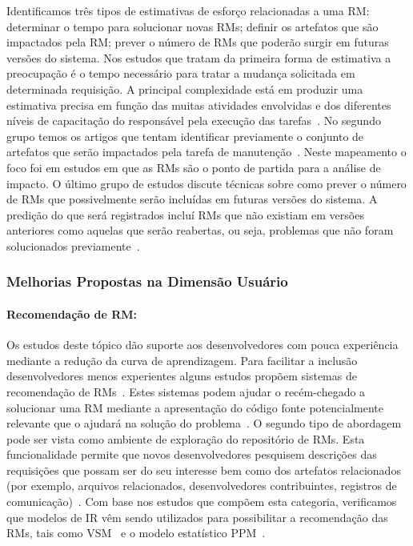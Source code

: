 Identificamos três tipos de estimativas de esforço relacionadas a uma RM\@:
determinar o tempo para solucionar novas RMs; definir os artefatos que são
impactados pela RM\@; prever o número de RMs que poderão surgir em futuras
versões do sistema. Nos estudos que tratam da primeira forma de estimativa a
preocupação é o tempo necessário para tratar a mudança solicitada em determinada
requisição. A principal complexidade está em produzir uma estimativa precisa em
função das muitas atividades envolvidas e dos diferentes níveis de capacitação
do responsável pela execução das tarefas~\cite{xia2015automatic}. No segundo
grupo temos os artigos que tentam identificar previamente o conjunto de
artefatos que serão impactados pela tarefa de manutenção~\cite{Nagwani2010}.
Neste mapeamento o foco foi em estudos em que as RMs são o ponto de partida para
a análise de impacto. O último grupo de estudos discute técnicas sobre como
prever o número de RMs que possivelmente serão incluídas em futuras versões do
sistema. A predição do que será registrados incluí RMs que não existiam em
versões anteriores como aquelas que serão reabertas, ou seja, problemas que não
foram solucionados previamente~\cite{xia2015automatic}.

\subsubsection{Melhorias Propostas na Dimensão Usuário}
\label{ssub:melhorias_dim_usuario}

\paragraph{Recomendação de RM:}

Os estudos deste tópico dão suporte aos desenvolvedores com pouca experiência
mediante a redução da curva de aprendizagem. Para facilitar a inclusão
desenvolvedores menos experientes alguns estudos propõem sistemas de
recomendação de RMs~\cite{malheiros2012source, Wang2011bug}. Estes sistemas
podem ajudar o recém-chegado a solucionar uma RM mediante a apresentação do
código fonte potencialmente relevante que o ajudará na solução do
problema~\cite{malheiros2012source}. O segundo tipo de abordagem pode ser vista
como ambiente de exploração do repositório de RMs. Esta funcionalidade permite
que novos desenvolvedores pesquisem descrições das requisições que possam ser do
seu interesse bem como dos artefatos relacionados (por exemplo, arquivos
relacionados, desenvolvedores contribuintes, registros de
comunicação)~\cite{Wang2011bug}. Com base nos estudos que compõem esta
categoria, verificamos que modelos de IR vêm sendo utilizados para possibilitar
a recomendação das RMs\@, tais como VSM~\cite{Wang2011bug} e o modelo
estatístico PPM~\cite{malheiros2012source}.


